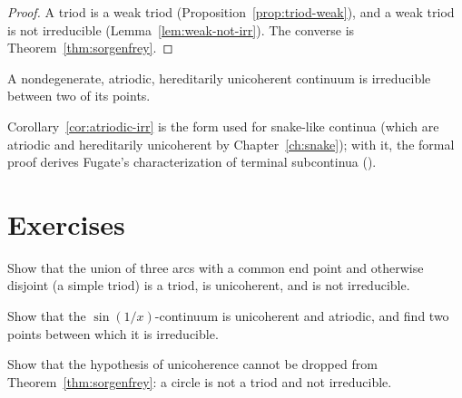 \begin{proof}
A triod is a weak triod (Proposition~\ref{prop:triod-weak}), and a weak triod is not irreducible
(Lemma~\ref{lem:weak-not-irr}). The converse is Theorem~\ref{thm:sorgenfrey}.
\end{proof}


\begin{corollary}\label{cor:atriodic-irr}
A nondegenerate, atriodic, hereditarily unicoherent continuum is irreducible between two of its
points.
\end{corollary}


\begin{remark}
Corollary~\ref{cor:atriodic-irr} is the form used for snake-like continua (which are atriodic and
hereditarily unicoherent by Chapter~\ref{ch:snake}); with it, the formal proof derives Fugate's
characterization of terminal subcontinua ().
\end{remark}

\section*{Exercises}

\begin{exercise}
Show that the union of three arcs with a common end point and otherwise disjoint (a simple triod)
is a triod, is unicoherent, and is not irreducible.
\end{exercise}

\begin{exercise}
Show that the $\sin(1/x)$-continuum is unicoherent and atriodic, and find two points between which
it is irreducible.
\end{exercise}

\begin{exercise}
Show that the hypothesis of unicoherence cannot be dropped from Theorem~\ref{thm:sorgenfrey}: a
circle is not a triod and not irreducible.
\end{exercise}
